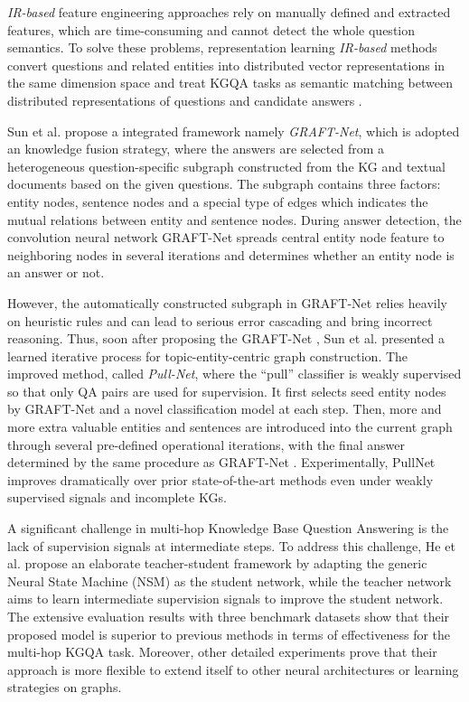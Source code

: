 \documentclass[pdflatex,sn-mathphys]{sn-jnl}%
\theoremstyle{thmstyleone}%
\theoremstyle{thmstyletwo}%
\theoremstyle{thmstylethree}%
\begin{document}

\textit{IR-based} feature engineering approaches \cite{irfrmethod} rely on manually defined and extracted features, which are time-consuming and cannot detect the whole question semantics. To solve these problems, representation learning \textit{IR-based} methods convert questions and related entities into distributed vector representations in the same dimension space and treat KGQA tasks as semantic matching between distributed representations of questions and candidate answers \cite{fu2020surveyQA}. 

Sun et al. \cite{sun2018graftnet} propose a integrated framework namely \textit{GRAFT-Net}, which is adopted an knowledge fusion strategy, where the answers are selected from a heterogeneous question-specific subgraph constructed from the KG and textual documents based on the given questions. The subgraph contains three factors: entity nodes, sentence nodes and a special type of edges which indicates the mutual relations between entity and sentence nodes. During answer detection, the convolution neural network GRAFT-Net spreads central entity node feature to neighboring nodes in several iterations and determines whether an entity node is an answer or not.

However, the automatically constructed subgraph in GRAFT-Net relies heavily on heuristic rules and can lead to serious error cascading and bring incorrect reasoning. Thus, soon after proposing the GRAFT-Net \cite{sun2018graftnet}, Sun et al. \cite{pullnet} presented a learned iterative process for topic-entity-centric graph construction. The improved method, called \textit{Pull-Net}, where the ``pull'' classifier is weakly supervised so that only QA pairs are used for supervision. It first selects seed entity nodes by GRAFT-Net and a novel classification model at each step. Then, more and more extra valuable entities and sentences are introduced into the current graph through several pre-defined operational iterations, with the final answer determined by the same procedure as GRAFT-Net \cite{sun2018graftnet}. Experimentally, PullNet improves dramatically over prior state-of-the-art methods \cite{sun2018graftnet,jain2016fmnKGQA,irfrmethod} even under weakly supervised signals and incomplete KGs.

A significant challenge in multi-hop Knowledge Base Question Answering is the lack of supervision signals at intermediate steps. To address this challenge, He et al. \cite{he2021stu-teaQA} propose an elaborate teacher-student framework by adapting the generic Neural State Machine (NSM) \cite{nsm} as the student network, while the teacher network aims to learn intermediate supervision signals to improve the student network. The extensive evaluation results with three benchmark datasets show that their proposed model is superior to previous methods in terms of effectiveness for the multi-hop KGQA task. Moreover, other detailed experiments prove that their approach is more flexible to extend itself to other neural architectures or learning strategies on graphs.
\end{document}
